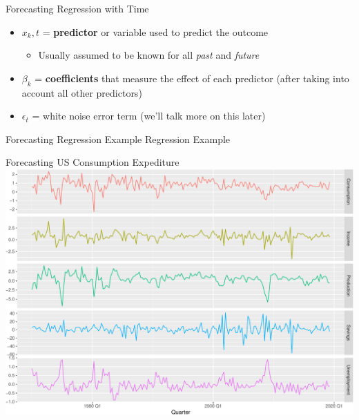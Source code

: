 \documentclass[
  ignorenonframetext,
]{beamer}
\providecommand{\tightlist}{%
  \setlength{\itemsep}{0pt}\setlength{\parskip}{0pt}}
\begin{document}
\begin{frame}{Forecasting \textbar{} \small Regression with Time}
\pause

\begin{itemize}
\item
  \(x_k,t\) = \textbf{predictor} or variable used to predict the outcome

  \begin{itemize}
  \tightlist
  \item
    Usually assumed to be known for all \textit{past} and
    \textit{future}
  \end{itemize}
\end{itemize}

\pause

\begin{itemize}
\tightlist
\item
  \(\beta_k\) = \textbf{coefficients} that measure the effect of each
  predictor (after taking into account all other predictors)
\end{itemize}

\pause

\begin{itemize}
\tightlist
\item
  \(\epsilon_t\) = white noise error term (we'll talk more on this
  later)
\end{itemize}
\end{frame}

\begin{frame}{Forecasting \textbar{} \small Regression Example}
\protect\hypertarget{forecasting-regression-example}{}
\center Regression Example
\end{frame}

\begin{frame}{Forecasting \textbar{} \small US Consumption Expediture}
\protect\hypertarget{forecasting-us-consumption-expediture}{}
\includegraphics{Time-series-regression-models_files/figure-beamer/unnamed-chunk-9-1.pdf}
\end{frame}
\end{document}
